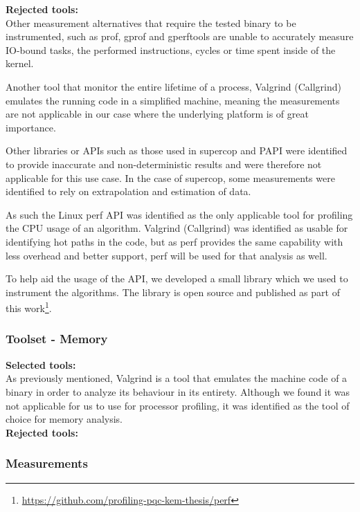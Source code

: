 \noindent
\textbf{Rejected tools:}\\
Other measurement alternatives that require the tested binary to be instrumented, such as prof, gprof and gperftools are unable to accurately measure IO-bound tasks, the performed instructions, cycles or time spent inside of the kernel.

Another tool that monitor the entire lifetime of a process, Valgrind (Callgrind) emulates the running code in a simplified machine, meaning the measurements are not applicable in our case where the underlying platform is of great importance.

Other libraries or APIs such as those used in \gls{supercop} and PAPI were identified to provide inaccurate and non-deterministic results and were therefore not applicable for this use case. In the case of \gls{supercop}, some measurements were identified to rely on extrapolation and estimation of data.

As such the Linux perf API was identified as the only applicable tool for profiling the CPU usage of an algorithm. Valgrind (Callgrind) was identified as usable for identifying hot paths in the code, but as perf provides the same capability with less overhead and better support, perf will be used for that analysis as well.

To help aid the usage of the API, we developed a small library which we used to instrument the algorithms. The library is open source and published as part of this work\footnote{\href{https://github.com/profiling-pqc-kem-thesis/perf}{https://github.com/profiling-pqc-kem-thesis/perf}}.

\subsubsection{Toolset - Memory}
\textbf{Selected tools:}\\
As previously mentioned, Valgrind is a tool that emulates the machine code of a binary in order to analyze its behaviour in its entirety. Although we found it was not applicable for us to use for processor profiling, it was identified as the tool of choice for memory analysis.\\ 

\noindent
\textbf{Rejected tools:}\\

\subsubsection{Measurements}

